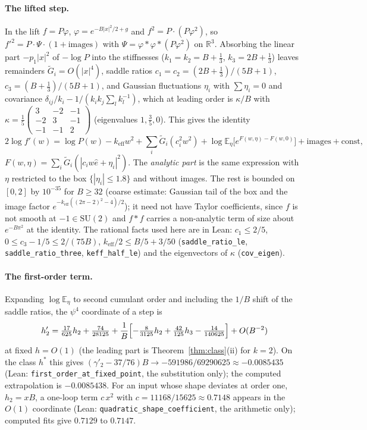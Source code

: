 \documentclass[11pt,a4paper]{article}
\theoremstyle{definition}
\theoremstyle{remark}
\newcommand{\E}{\mathbb{E}}
\newcommand{\R}{\mathbb{R}}
\newcommand{\SU}{\mathrm{SU}(2)}
\newcommand{\code}[1]{\texttt{#1}}
\begin{document}
\paragraph{The lifted step.}
In the lift $f=P\varphi$, $\varphi=e^{-B|x|^2/2+g}$ and $f^2=P\cdot(P\varphi^2)$, so $f'^2=P\cdot\Psi\cdot(1+\text{images})$ with $\Psi=\varphi*\varphi*(P\varphi^2)$ on $\R^3$.
Absorbing the linear part $-p_1|x|^2$ of $-\log P$ into the stiffnesses ($k_1=k_2=B+\tfrac13$, $k_3=2B+\tfrac13$) leaves remainders $\tilde G_i=O(|x|^4)$, saddle ratios $c_1=c_2=(2B+\tfrac13)/(5B+1)$, $c_3=(B+\tfrac13)/(5B+1)$, and Gaussian fluctuations $\eta_i$ with $\sum\eta_i=0$ and covariance $\delta_{ij}/k_i-1/(k_ik_j\sum_l k_l^{-1})$, which at leading order is $\kappa/B$ with $\kappa=\tfrac15\left(\begin{smallmatrix}3&-2&-1\\-2&3&-1\\-1&-1&2\end{smallmatrix}\right)$ (eigenvalues $1,\tfrac35,0$).
This gives the identity
\[
2\log f'(w)=\log P(w)-k_{\mathrm{eff}}w^2+\sum_i\tilde G_i(c_i^2w^2)+\log\E_\eta\bigl[e^{F(w,\eta)-F(w,0)}\bigr]+\text{images}+\mathrm{const},
\]
$F(w,\eta)=\sum_i\tilde G_i(|c_iw\hat e+\eta_i|^2)$.
The \emph{analytic part} is the same expression with $\eta$ restricted to the box $\{|\eta_i|\le1.8\}$ and without images.
The rest is bounded on $[0,2]$ by $10^{-35}$ for $B\ge32$ (coarse estimate: Gaussian tail of the box and the image factor $e^{-k_{\mathrm{eff}}((2\pi-2)^2-4)/2}$); it need not have Taylor coefficients, since $f$ is not smooth at $-1\in\SU$ and $f*f$ carries a non-analytic term of size about $e^{-B\pi^2}$ at the identity.
The rational facts used here are in Lean: $c_1\le2/5$, $0\le c_3-1/5\le2/(75B)$, $k_{\mathrm{eff}}/2\le B/5+3/50$ (\code{saddle\_ratio\_le}, \code{saddle\_ratio\_three}, \code{keff\_half\_le}) and the eigenvectors of $\kappa$ (\code{cov\_eigen}).

\paragraph{The first-order term.}
Expanding $\log\E_\eta$ to second cumulant order and including the $1/B$ shift of the saddle ratios, the $\psi^4$ coordinate of a step is
\[
h_2'=\tfrac{17}{625}h_2+\tfrac{74}{28125}+\frac1B\Bigl[-\tfrac{8}{3125}h_2+\tfrac{42}{125}h_3-\tfrac{14}{140625}\Bigr]+O(B^{-2})
\]
at fixed $h=O(1)$ (the leading part is Theorem~\ref{thm:class}(ii) for $k=2$). On the class $h^*$ this gives $(\gamma'_2-37/76)B\to-591986/69290625\approx-0.0085435$ (Lean: \code{first\_order\_at\_fixed\_point}, the substitution only); the computed extrapolation is $-0.0085438$.
For an input whose shape deviates at order one, $h_2=xB$, a one-loop term $c\,x^2$ with $c=11168/15625\approx0.7148$ appears in the $O(1)$ coordinate (Lean: \code{quadratic\_shape\_coefficient}, the arithmetic only); computed fits give $0.7129$ to $0.7147$.
\end{document}
